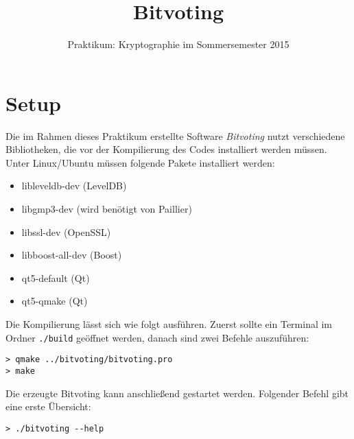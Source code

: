 \documentclass[colorback,accentcolor=tud1b]{tudreport}
\begin{document}
\title{Bitvoting}
\subtitle{Praktikum: Kryptographie im Sommersemester 2015}
\maketitle
\section{Setup}
Die im Rahmen dieses Praktikum erstellte Software \textit{Bitvoting} nutzt verschiedene Bibliotheken, die vor der Kompilierung des Codes installiert werden müssen.
\newline
\newline
Unter Linux/Ubuntu müssen folgende Pakete installiert werden:
\newline
\newline
\begin{minipage}[t]{0.5\textwidth}
\begin{itemize}
\item libleveldb-dev (LevelDB)
\item libgmp3-dev (wird benötigt von Paillier)
\item libssl-dev (OpenSSL)\end{itemize}
\end{minipage}
\begin{minipage}[t]{0.5\textwidth}
\begin{itemize}
\item libboost-all-dev (Boost)
\item qt5-default (Qt)
\item qt5-qmake	(Qt)
\end{itemize}
\end{minipage}
\newline
\newline
\newline
Die Kompilierung lässt sich wie folgt ausführen. Zuerst sollte ein Terminal im Ordner \texttt{./build} geöffnet werden, danach sind zwei Befehle auszuführen:
\begin{verbatim}
> qmake ../bitvoting/bitvoting.pro
> make
\end{verbatim}
Die erzeugte Bitvoting kann anschließend gestartet werden. Folgender Befehl gibt eine erste Übersicht:
\begin{verbatim}
> ./bitvoting --help
\end{verbatim}
\end{document}
